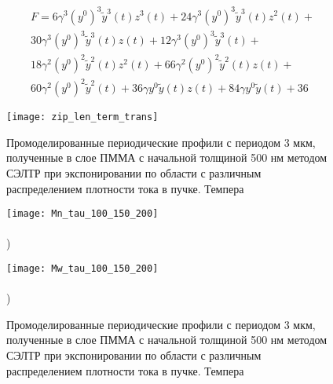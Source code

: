 \documentclass[12pt, letterpaper]{article}
\begin{document}
\begin{equation}
	\begin{aligned}
		F = 6 \gamma^{3} \left(y^{0}\right)^{3} \tilde{y}^{3}{\left(t \right)} z^{3}{\left(t \right)} + 24 \gamma^{3} \left(y^{0}\right)^{3} \tilde{y}^{3}{\left(t \right)} z^{2}{\left(t \right)} + \\
		30 \gamma^{3} \left(y^{0}\right)^{3} \tilde{y}^{3}{\left(t \right)} z{\left(t \right)} + 12 \gamma^{3} \left(y^{0}\right)^{3} \tilde{y}^{3}{\left(t \right)} + \\
		18 \gamma^{2} \left(y^{0}\right)^{2} \tilde{y}^{2}{\left(t \right)} z^{2}{\left(t \right)} + 66 \gamma^{2} \left(y^{0}\right)^{2} \tilde{y}^{2}{\left(t \right)} z{\left(t \right)} + \\
		60 \gamma^{2} \left(y^{0}\right)^{2} \tilde{y}^{2}{\left(t \right)} + 36 \gamma y^{0} \tilde{y}{\left(t \right)} z{\left(t \right)} + 84 \gamma y^{0} \tilde{y}{\left(t \right)} + 36
	\end{aligned}
\end{equation}


\begin{figure}
	\begin{center}
		\texttt{[image: zip\_len\_term\_trans]}
	\end{center}
	
	\vspace{-2em}
	
	\caption{Промоделированные периодические профили с периодом 3 мкм, полученные в слое ПММА с начальной толщиной 500 нм методом СЭЛТР при экспонировании по области с различным распределением плотности тока в пучке. Темпера}
	\label{fig:DEBER_multibeam}
\end{figure}


\begin{figure}
	\begin{minipage}{0.48\textwidth}
		\texttt{[image: Mn\_tau\_100\_150\_200]} \\
		\vspace{-13em} \\ ) \\ \vspace{13em}
	\end{minipage}
	\begin{minipage}{0.48\textwidth}
		\texttt{[image: Mw\_tau\_100\_150\_200]} \\
		\vspace{-13em} \\ ) \\ \vspace{13em}
	\end{minipage}

	\vspace{-4em}

	\caption{Промоделированные периодические профили с периодом 3 мкм, полученные в слое ПММА с начальной толщиной 500 нм методом СЭЛТР при экспонировании по области с различным распределением плотности тока в пучке. Темпера}
	\label{fig:DEBER_multibeam}
\end{figure}
\end{document}
